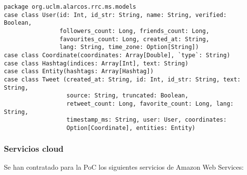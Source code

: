 \lstset{escapechar=@,language=scala}
\begin{lstlisting}[caption={Entidades de transformación en Scala},captionpos=b, label=msclasses]
package org.uclm.alarcos.rrc.ms.models
case class User(id: Int, id_str: String, name: String, verified: Boolean,
                followers_count: Long, friends_count: Long,
                favourites_count: Long, created_at: String,                
                lang: String, time_zone: Option[String])
case class Coordinate(coordinates: Array[Double], `type`: String)
case class Hashtag(indices: Array[Int], text: String)
case class Entity(hashtags: Array[Hashtag])
case class Tweet (created_at: String, id: Int, id_str: String, text: String,
                  source: String, truncated: Boolean,
                  retweet_count: Long, favorite_count: Long, lang: String,
                  timestamp_ms: String, user: User, coordinates:
                  Option[Coordinate], entities: Entity)
\end{lstlisting}


\subsubsection{Servicios cloud}
\label{res:cloud}
Se han contratado para la \acs{PoC} los siguientes servicios de Amazon Web
Services: 

